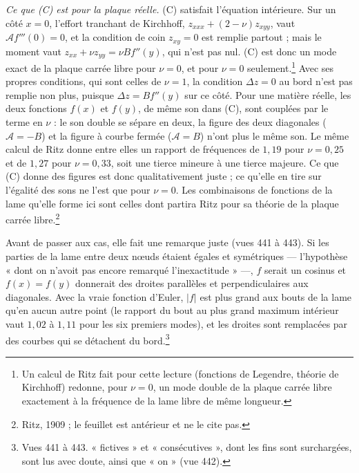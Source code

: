 \documentclass[11pt,a4paper]{article}
\begin{document}
\emph{Ce que (C) est pour la plaque réelle.} (C) satisfait l'équation intérieure. Sur
un côté $x = 0$, l'effort tranchant de Kirchhoff, $z_{xxx} + (2-\nu)z_{xyy}$, vaut
$\mathcal{A}f'''(0) = 0$, et la condition de coin $z_{xy} = 0$ est remplie partout ;
mais le moment vaut $z_{xx} + \nu z_{yy} = \nu B f''(y)$, qui n'est pas nul. (C) est
donc un mode exact de la plaque carrée libre pour $\nu = 0$, et pour $\nu = 0$
seulement.\footnote{Un calcul de Ritz fait pour cette lecture (fonctions de Legendre,
théorie de Kirchhoff) redonne, pour $\nu = 0$, un mode double de la plaque carrée
libre exactement à la fréquence de la lame libre de même longueur.} Avec ses propres
conditions, qui sont celles de $\nu = 1$, la condition $\Delta z = 0$ au bord n'est pas
remplie non plus, puisque $\Delta z = B f''(y)$ sur ce côté. Pour une matière réelle,
les deux fonctions $f(x)$ et $f(y)$, de même son dans (C), sont couplées par le terme
en $\nu$ : le son double se sépare en deux, la figure des deux diagonales
($\mathcal{A} = -B$) et la figure à courbe fermée ($\mathcal{A} = B$) n'ont plus le même
son. Le même calcul de Ritz donne entre elles un rapport de fréquences de $1{,}19$ pour
$\nu = 0{,}25$ et de $1{,}27$ pour $\nu = 0{,}33$, soit une tierce mineure à une tierce
majeure. Ce que (C) donne des figures est donc qualitativement juste ; ce qu'elle en
tire sur l'égalité des sons ne l'est que pour $\nu = 0$. Les combinaisons de fonctions
de la lame qu'elle forme ici sont celles dont partira Ritz pour sa théorie de la plaque
carrée libre.\footnote{Ritz, 1909 ; le feuillet est antérieur et ne le cite pas.}

Avant de passer aux cas, elle fait une remarque juste (vues 441 à 443). Si les
parties de la lame entre deux nœuds étaient égales et symétriques — l'hypothèse
« dont on n'avoit pas encore remarqué l'inexactitude » —, $f$ serait un cosinus et
$f(x) = f(y)$ donnerait des droites parallèles et perpendiculaires aux diagonales. Avec
la vraie fonction d'Euler, $|f|$ est plus grand aux bouts de la lame qu'en aucun autre
point (le rapport du bout au plus grand maximum intérieur vaut $1{,}02$ à $1{,}11$ pour
les six premiers modes), et les droites sont remplacées par des courbes qui se
détachent du bord.\footnote{Vues 441 à 443. « fictives » et « consécutives », dont les
fins sont surchargées, sont lus avec doute, ainsi que « on » (vue 442).}
\end{document}
